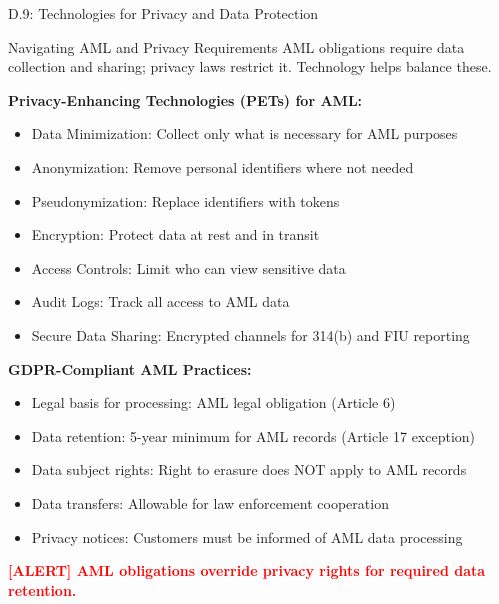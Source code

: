 \documentclass[11pt,a4paper]{beamer}
\newcommand{\redflag}[1]{\textcolor{red}{\textbf{[ALERT] #1}}}
\begin{document}
\begin{frame}{D.9: Technologies for Privacy and Data Protection}
	\begin{block}{Navigating AML and Privacy Requirements}
		AML obligations require data collection and sharing; privacy laws restrict it. Technology helps balance these.
	\end{block}
	\textbf{Privacy-Enhancing Technologies (PETs) for AML:}
	\begin{itemize}
		\item Data Minimization: Collect only what is necessary for AML purposes
		\item Anonymization: Remove personal identifiers where not needed
		\item Pseudonymization: Replace identifiers with tokens
		\item Encryption: Protect data at rest and in transit
		\item Access Controls: Limit who can view sensitive data
		\item Audit Logs: Track all access to AML data
		\item Secure Data Sharing: Encrypted channels for 314(b) and FIU reporting
	\end{itemize}
	\textbf{GDPR-Compliant AML Practices:}
	\begin{itemize}
		\item Legal basis for processing: AML legal obligation (Article 6)
		\item Data retention: 5-year minimum for AML records (Article 17 exception)
		\item Data subject rights: Right to erasure does NOT apply to AML records
		\item Data transfers: Allowable for law enforcement cooperation
		\item Privacy notices: Customers must be informed of AML data processing
	\end{itemize}
	\redflag{AML obligations override privacy rights for required data retention.}
\end{frame}
\end{document}
